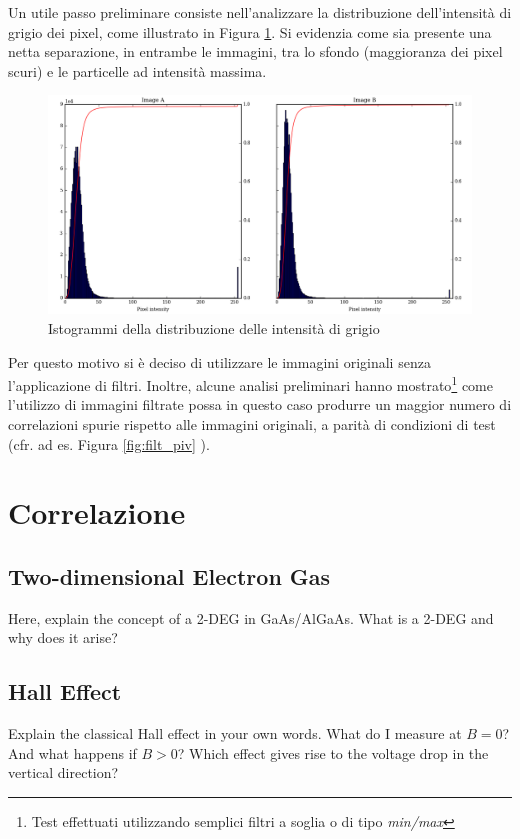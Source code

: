 \documentclass[a4paper]{article}
\begin{document}
Un utile passo preliminare consiste nell'analizzare la distribuzione dell'intensità di grigio dei pixel, come illustrato in Figura \ref{fig:hist}. Si evidenzia come sia presente una netta separazione, in entrambe le immagini, tra lo sfondo (maggioranza dei pixel scuri) e le particelle ad intensità massima.

\begin{figure}[h]
	\centering
	\includegraphics[width=1\textwidth]{images/hist_cr.png}
	\caption{\label{fig:hist}Istogrammi della distribuzione delle intensità di grigio}
\end{figure}

Per questo motivo si è deciso di utilizzare le immagini originali senza l'applicazione di filtri. Inoltre, alcune analisi preliminari hanno mostrato\footnote{Test effettuati utilizzando semplici filtri a soglia o di tipo \textit{min/max}\cite{mmaxf}} come l'utilizzo di immagini filtrate possa in questo caso produrre un maggior numero di correlazioni spurie rispetto alle immagini originali, a parità di condizioni di test (cfr. ad es. Figura \ref{fig:filt_piv} ).


\section{Correlazione}
\label{sec:corr}

\subsection{Two-dimensional Electron Gas}
Here, explain the concept of a 2-DEG in GaAs/AlGaAs. What is a 2-DEG and why does it arise?

\subsection{Hall Effect}
Explain the classical Hall effect in your own words. What do I measure at $B=0$? And what happens if $B>0$? Which effect gives rise to the voltage drop in the vertical direction?
\end{document}
